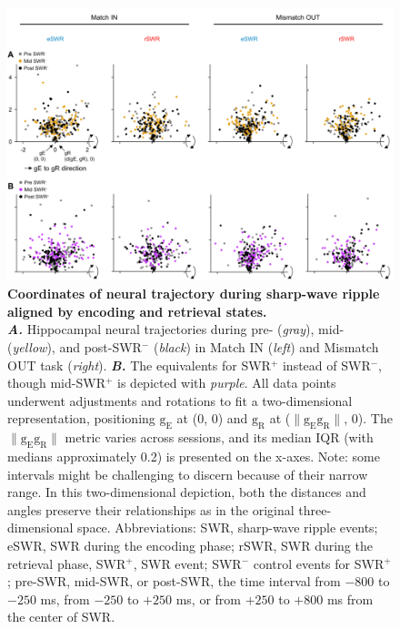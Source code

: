 \documentclass[final,3p,times,twocolumn]{elsarticle}
\begin{document}
        \begin{figure}[ht]
        	\centering
            \includegraphics[width=1\textwidth]{./src/figures/.png/Figure_ID_06.png}
        	\caption{\textbf{
Coordinates of neural trajectory during sharp-wave ripple aligned by encoding and retrieval states.
}
\smallskip
\\
\textbf{\textit{A.}} Hippocampal neural trajectories during pre- (\textit{gray}), mid- (\textit{yellow}), and post-SWR$^-$ (\textit{black}) in Match IN (\textit{left}) and Mismatch OUT task (\textit{right}). \textbf{\textit{B.}} The equivalents for SWR$^+$ instead of SWR$^-$, though mid-SWR$^+$ is depicted with \textit{purple}. All data points underwent adjustments and rotations to fit a two-dimensional representation, positioning $\mathrm{g_{E}}$ at (0, 0) and $\mathrm{g_{R}}$ at ($\lVert \mathrm{g_{E}g_{R}} \rVert$, 0). The $\lVert \mathrm{g_{E}g_{R}} \rVert$ metric varies across sessions, and its median \textpm IQR (with medians approximately 0.2) is presented on the x-axes. Note: some intervals might be challenging to discern because of their narrow range. In this two-dimensional depiction, both the distances and angles preserve their relationships as in the original three-dimensional space. Abbreviations: SWR, sharp-wave ripple events; eSWR, SWR during the encoding phase; rSWR, SWR during the retrieval phase, SWR$^+$, SWR event; SWR$^-$ control events for SWR$^+$; pre-SWR, mid-SWR, or post-SWR, the time interval from $-800$ to $-250$ ms, from $-250$ to $+250$ ms, or from $+250$ to $+800$ ms from the center of SWR.
}
        	\label{fig:06}
        \end{figure}
\end{document}
